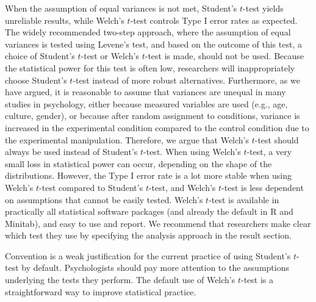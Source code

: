 \documentclass[
  english,
  man]{apa6}
\begin{document}
When the assumption of equal variances is not met, Student's \(t\)-test yields unreliable results, while Welch's \(t\)-test controls Type I error rates as expected. The widely recommended two-step approach, where the assumption of equal variances is tested using Levene's test, and based on the outcome of this test, a choice of Student's \(t\)-test or Welch's \(t\)-test is made, should not be used. Because the statistical power for this test is often low, researchers will inappropriately choose Student's \(t\)-test instead of more robust alternatives. Furthermore, as we have argued, it is reasonable to assume that variances are unequal in many studies in psychology, either because measured variables are used (e.g., age, culture, gender), or because after random assignment to conditions, variance is increased in the experimental condition compared to the control condition due to the experimental manipulation. Therefore, we argue that Welch's \(t\)-test should always be used instead of Student's \(t\)-test. When using Welch's \(t\)-test, a very small loss in statistical power can occur, depending on the shape of the distributions. However, the Type I error rate is a lot more stable when using Welch's \(t\)-test compared to Student's \(t\)-test, and Welch's \(t\)-test is less dependent on assumptions that cannot be easily tested. Welch's \(t\)-test is available in practically all statistical software packages (and already the default in R and Minitab), and easy to use and report. We recommend that researchers make clear which test they use by specifying the analysis approach in the result section.

Convention is a weak justification for the current practice of using Student's \(t\)-test by default. Psychologists should pay more attention to the assumptions underlying the tests they perform. The default use of Welch's \(t\)-test is a straightforward way to improve statistical practice.
\end{document}
